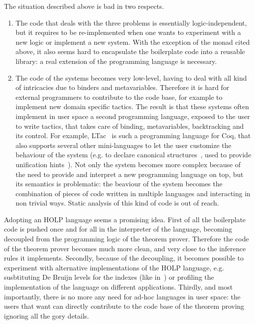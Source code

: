 \documentclass[preprint]{sigplanconf}
\begin{document}
The situation described above is bad in two respects.
\begin{enumerate}
\item The code that deals with the three problems is essentially logic-independent, but it requires to be re-implemented when one wants to experiment with a new logic or implement a new system. With the exception of the monad cited above, it also seems hard to encapsulate the boilerplate code into a reusable library: a real extension of the programming language is necessary.
\item The code of the systems becomes very low-level, having to deal with all kind of intricacies due to binders and metavariables. Therefore it is hard for external programmers to contribute to the code base, for example to implement new domain specific tactics. The result is that these systems often implement in user space a second programming language, exposed to the user to write tactics, that takes care of binding, metavariables, backtracking and its control. For example, LTac~\cite{delahaye2000} is such a programming language for Coq, that also supports several other mini-languages to let the user customize the behaviour of the system (e.g. to declare canonical structures~\cite{canstruct}, used to provide unification hints~\cite{asperti1}). Not only the system becomes more complex because of the need to provide and interpret a new programming language on top, but its semantics is problematic: the beaviour of the system becomes the combination of pieces of code written in multiple languages and interacting in non trivial ways. Static analysis of this kind of code is out of reach.
\end{enumerate}

Adopting an HOLP language seems a promising idea. First of all the boilerplate code is pushed once and for all in the interpreter of the language, becoming decoupled from the programming logic of the theorem prover. Therefore the code of the theorem prover becomes much more clean, and very close to the inference rules it implements. Secondly, because of the decoupling, it becomes possible to experiment with alternative implementations of the HOLP language, e.g. susbtituting De Bruijn levels for the indexes (like in~\cite{debrujn1}) or profiling the implementation of the language on different applications. Thirdly, and most importantly, there is no more any need for ad-hoc languages in user space: the users that want can directly contribute to the code base of the theorem proving ignoring all the gory details.
\end{document}
